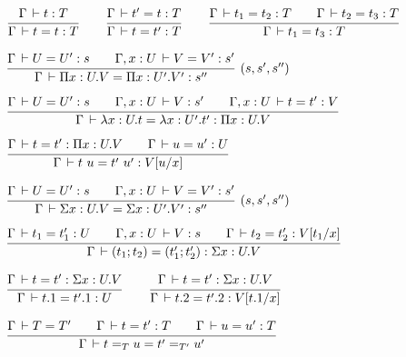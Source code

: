 \documentclass[a4paper,english]{lipics-utf8x}
\begin{document}

  \begin{center}
  \(
    \ru{\Gamma \der t : T
      }{\Gamma \der t = t : T}
    \qquad
    \ru{\Gamma \der t' = t : T
      }{\Gamma \der t = t' : T}
    \qquad
    \ru{\Gamma \der t_1 = t_2 : T \qquad
        \Gamma \der t_2 = t_3 : T
      }{\Gamma \der t_1 = t_3 : T}
  \)
  \end{center}


  \begin{center}
  \(
    \rux{\Gamma \der U = U' : s \qquad
         \Gamma, x:U \der V = V' : s'
       }{\Gamma \der \Pi x:U.V = \Pi x:U'.V' : s''
       }{(s,s',s'')}
  \)
  \end{center}

  \begin{center}
  \(
    \ru{\Gamma \der U = U' : s \qquad
        \Gamma, x:U \der V : s' \qquad
        \Gamma, x:U \der t = t' : V
      }{\Gamma \der \lambda x:U.t = \lambda x:U'.t' : \Pi x:U.V}
  \)
  \end{center}

  \begin{center}
  \(
    \ru{\Gamma \der t = t' : \Pi x:U.V \qquad
        \Gamma \der u = u' : U
      }{\Gamma \der t~u = t'~u' : V[u/x]}
  \)
  \end{center}

  \begin{center}
  \(
    \rux{\Gamma \der U = U' : s \qquad
         \Gamma, x:U \der V = V' : s'
       }{\Gamma \der \Sigma x:U.V = \Sigma x:U'.V' : s''
       }{(s,s',s'')}
  \)
  \end{center}

  \begin{center}
  \(
    \ru{\Gamma \der t_1 = t'_1 : U \qquad
        \Gamma, x:U \der V : s \qquad
        \Gamma \der t_2 = t'_2 : V[t_1/x]
      }{\Gamma \der (t_1;t_2) = (t'_1;t'_2) : \Sigma x:U.V}
  \)
  \end{center}

  \begin{center}
  \(
    \ru{\Gamma \der t = t' : \Sigma x:U.V
      }{\Gamma \der t.1 = t'.1 : U}
    \qquad
    \ru{\Gamma \der t = t' : \Sigma x:U.V
      }{\Gamma \der t.2 = t'.2 : V[t.1/x]}
  \)
  \end{center}

  \begin{center}
  \(
    \ru{\Gamma \der T = T' \qquad
        \Gamma \der t = t' : T \qquad
        \Gamma \der u = u' : T
      }{\Gamma \der t =_T u = t' =_{T'} u'}
  \)
  \end{center}
\end{document}
